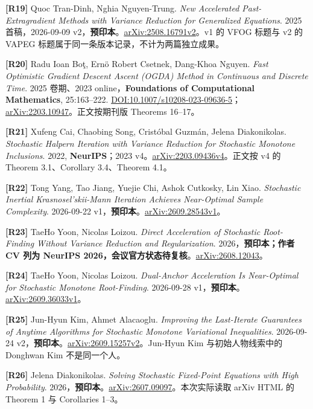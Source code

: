 \documentclass[
  chinese,
  10pt,
  a4paper,
]{article}
\begin{document}
\textbf{{[}R19{]}} Quoc Tran-Dinh, Nghia Nguyen-Trung. \emph{New
Accelerated Past-Extragradient Methods with Variance Reduction for
Generalized Equations}. 2025 首稿，2026-09-09
v2，\textbf{预印本}。\href{https://arxiv.org/abs/2508.16791v2}{arXiv:2508.16791v2}。v1
的 VFOG 标题与 v2 的 VAPEG 标题属于同一条版本记录，不计为两篇独立成果。

\textbf{{[}R20{]}} Radu Ioan Boţ, Ernö Robert Csetnek, Dang-Khoa Nguyen.
\emph{Fast Optimistic Gradient Descent Ascent (OGDA) Method in
Continuous and Discrete Time}. 2025 卷期、2023
online，\textbf{Foundations of Computational Mathematics}, 25:163--222.
\href{https://doi.org/10.1007/s10208-023-09636-5}{DOI:10.1007/s10208-023-09636-5}；\href{https://arxiv.org/abs/2203.10947}{arXiv:2203.10947}。正文按期刊版
Theorems 16--17。

\textbf{{[}R21{]}} Xufeng Cai, Chaobing Song, Cristóbal Guzmán, Jelena
Diakonikolas. \emph{Stochastic Halpern Iteration with Variance Reduction
for Stochastic Monotone Inclusions}. 2022, \textbf{NeurIPS}；2023
v4。\href{https://arxiv.org/abs/2203.09436v4}{arXiv:2203.09436v4}。正文按
v4 的 Theorem 3.1、Corollary 3.4、Theorem 4.1。

\textbf{{[}R22{]}} Tong Yang, Tao Jiang, Yuejie Chi, Ashok Cutkosky, Lin
Xiao. \emph{Stochastic Inertial Krasnosel'skii-Mann Iteration Achieves
Near-Optimal Sample Complexity}. 2026-09-22
v1，\textbf{预印本}。\href{https://arxiv.org/abs/2609.28543v1}{arXiv:2609.28543v1}。

\textbf{{[}R23{]}} TaeHo Yoon, Nicolas Loizou. \emph{Direct Acceleration
of Stochastic Root-Finding Without Variance Reduction and
Regularization}. 2026，\textbf{预印本；作者 CV 列为 NeurIPS
2026，会议官方状态待复核}。\href{https://arxiv.org/abs/2608.12043}{arXiv:2608.12043}。

\textbf{{[}R24{]}} TaeHo Yoon, Nicolas Loizou. \emph{Dual-Anchor
Acceleration Is Near-Optimal for Stochastic Monotone Root-Finding}.
2026-09-28
v1，\textbf{预印本}。\href{https://arxiv.org/abs/2609.36033v1}{arXiv:2609.36033v1}。

\textbf{{[}R25{]}} Jun-Hyun Kim, Ahmet Alacaoglu. \emph{Improving the
Last-Iterate Guarantees of Anytime Algorithms for Stochastic Monotone
Variational Inequalities}. 2026-09-24
v2，\textbf{预印本}。\href{https://arxiv.org/abs/2609.15257v2}{arXiv:2609.15257v2}。Jun-Hyun
Kim 与初始人物线索中的 Donghwan Kim 不是同一个人。

\textbf{{[}R26{]}} Jelena Diakonikolas. \emph{Solving Stochastic
Fixed-Point Equations with High Probability}.
2026，\textbf{预印本}。\href{https://arxiv.org/abs/2607.09097}{arXiv:2607.09097}。本次实际读取
arXiv HTML 的 Theorem 1 与 Corollaries 1--3。
\end{document}

